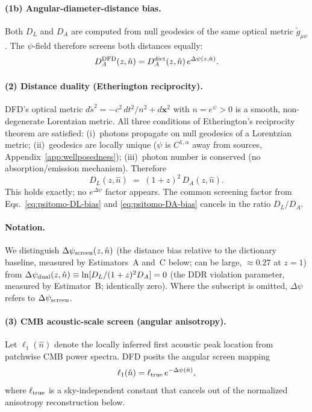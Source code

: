\paragraph{(1b) Angular-diameter-distance bias.}
Both $D_L$ and $D_A$ are computed from null geodesics of the same optical metric $\tilde g_{\mu\nu}$. The $\psi$-field therefore screens both distances equally:
\begin{equation}
D_A^{\rm DFD}(z,\hat n)=D_A^{\rm dict}(z,\hat n)\,e^{\Delta\psi(z,\hat n)}.
\label{eq:psitomo-DA-bias}
\end{equation}

\paragraph{(2) Distance duality (Etherington reciprocity).}\label{sec:psitomo-duality}
DFD's optical metric $d\tilde s^2 = -c^2\,dt^2/n^2 + d\mathbf{x}^2$ with $n = e^\psi > 0$ is a smooth, non-degenerate Lorentzian metric. All three conditions of Etherington's reciprocity theorem\cite{Etherington1933,Ellis2007} are satisfied: (i)~photons propagate on null geodesics of a Lorentzian metric; (ii)~geodesics are locally unique ($\psi$ is $C^{1,\alpha}$ away from sources, Appendix~\ref{app:wellposedness}); (iii)~photon number is conserved (no absorption/emission mechanism). Therefore
\begin{equation}
D_L(z,\hat n) \;=\; (1+z)^2\,D_A(z,\hat n).
\label{eq:psitomo-duality}
\end{equation}
This holds exactly; no $e^{\Delta\psi}$ factor appears. The common screening factor from Eqs.~\eqref{eq:psitomo-DL-bias} and \eqref{eq:psitomo-DA-bias} cancels in the ratio $D_L/D_A$.

\paragraph{Notation.} We distinguish $\Delta\psi_{\rm screen}(z,\hat n)$ (the distance bias relative to the dictionary baseline, measured by Estimators~A and~C below; can be large, $\approx 0.27$ at $z=1$) from $\Delta\psi_{\rm dual}(z,\hat n) \equiv \ln[D_L/(1+z)^2 D_A] = 0$ (the DDR violation parameter, measured by Estimator~B; identically zero). Where the subscript is omitted, $\Delta\psi$ refers to $\Delta\psi_{\rm screen}$.

\paragraph{(3) CMB acoustic-scale screen (angular anisotropy).}
Let $\ell_1(\hat n)$ denote the locally inferred first acoustic peak location from patchwise CMB power spectra.
DFD posits the angular screen mapping
\begin{equation}
\ell_1(\hat n)=\ell_{\rm true}\,e^{-\Delta\psi(\hat n)},
\label{eq:psitomo-cmb-ell1}
\end{equation}
where $\ell_{\rm true}$ is a sky-independent constant that cancels out of the normalized anisotropy reconstruction below.

